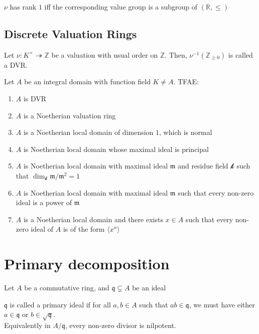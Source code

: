 \documentclass[oneside, 12pt]{scrbook}
\newcommand{\RR}{\mathbb R}
\newcommand{\ZZ}{\mathbb Z}
\newcommand{\m}{\mathfrak{m}}
\theoremstyle{theorem}
\begin{document}
\begin{theorem}
$\nu$ has rank $1$ iff the corresponding value group is a subgroup of $(\RR, \le)$
\end{theorem}
 
\section{Discrete Valuation Rings}

\begin{definition}
Let $\nu : K^{\times} \twoheadrightarrow \ZZ$ be a valuation with usual order on $\ZZ$. Then, $\nu^{-1}(\ZZ_{\geq 0})$ is called a DVR.
\end{definition}

\begin{theorem}
Let $A$ be an integral domain with function field $K \neq A$. TFAE: 
\begin{enumerate}
\item $A$ is DVR
\item $A$ is a Noetherian valuation ring
\item $A$ is a Noetherian local domain of dimension $1$, which is normal
\item $A$ is Noetherian local domain whose maximal ideal is principal
\item $A$ is Noetherian local domain with maximal ideal $\m$ and residue field $\mathcal{k}$ such that $\dim_{\mathcal{k}}\m / \m^2 = 1$
\item $A$ is Noetherian local domain with maximal ideal $\m$ such that every non-zero ideal is a power of $\m$
\item $A$ is a Noetherian local domain and there exists $x \in A$ such that every non-zero ideal of $A$ is of the form $\langle x^n \rangle$
\end{enumerate}
\end{theorem}


\chapter{Primary decomposition}

Let $A$ be a commutative ring, and $\mathfrak{q} \subsetneq A$ be an ideal 

\begin{definition}
$\mathfrak{q}$ is called a primary ideal if for all $a,b\in A$ such that $ab \in \mathfrak{q}$, we must have either $a \in \mathfrak{q}$ or $b \in \sqrt{\mathfrak{q}}$. \\
Equivalently in $A/\mathfrak{q}$, every non-zero divisor is nilpotent. 
\end{definition}
\end{document}
